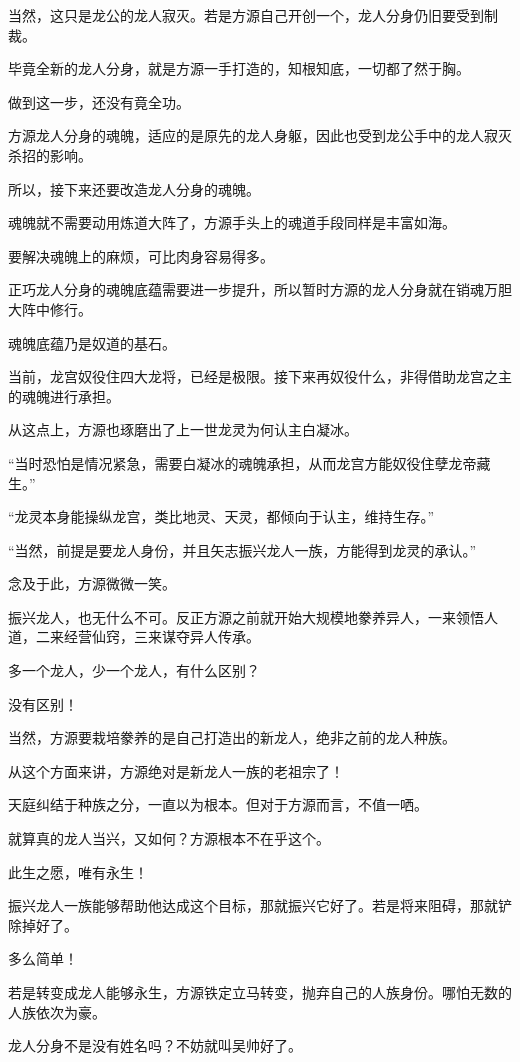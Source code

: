 \begin{this_body}
当然，这只是龙公的龙人寂灭。若是方源自己开创一个，龙人分身仍旧要受到制裁。

毕竟全新的龙人分身，就是方源一手打造的，知根知底，一切都了然于胸。

做到这一步，还没有竟全功。

方源龙人分身的魂魄，适应的是原先的龙人身躯，因此也受到龙公手中的龙人寂灭杀招的影响。

所以，接下来还要改造龙人分身的魂魄。

魂魄就不需要动用炼道大阵了，方源手头上的魂道手段同样是丰富如海。

要解决魂魄上的麻烦，可比肉身容易得多。

正巧龙人分身的魂魄底蕴需要进一步提升，所以暂时方源的龙人分身就在销魂万胆大阵中修行。

魂魄底蕴乃是奴道的基石。

当前，龙宫奴役住四大龙将，已经是极限。接下来再奴役什么，非得借助龙宫之主的魂魄进行承担。

从这点上，方源也琢磨出了上一世龙灵为何认主白凝冰。

“当时恐怕是情况紧急，需要白凝冰的魂魄承担，从而龙宫方能奴役住孽龙帝藏生。”

“龙灵本身能操纵龙宫，类比地灵、天灵，都倾向于认主，维持生存。”

“当然，前提是要龙人身份，并且矢志振兴龙人一族，方能得到龙灵的承认。”

念及于此，方源微微一笑。

振兴龙人，也无什么不可。反正方源之前就开始大规模地豢养异人，一来领悟人道，二来经营仙窍，三来谋夺异人传承。

多一个龙人，少一个龙人，有什么区别？

没有区别！

当然，方源要栽培豢养的是自己打造出的新龙人，绝非之前的龙人种族。

从这个方面来讲，方源绝对是新龙人一族的老祖宗了！

天庭纠结于种族之分，一直以为根本。但对于方源而言，不值一哂。

就算真的龙人当兴，又如何？方源根本不在乎这个。

此生之愿，唯有永生！

振兴龙人一族能够帮助他达成这个目标，那就振兴它好了。若是将来阻碍，那就铲除掉好了。

多么简单！

若是转变成龙人能够永生，方源铁定立马转变，抛弃自己的人族身份。哪怕无数的人族依次为豪。

龙人分身不是没有姓名吗？不妨就叫吴帅好了。


\end{this_body}
